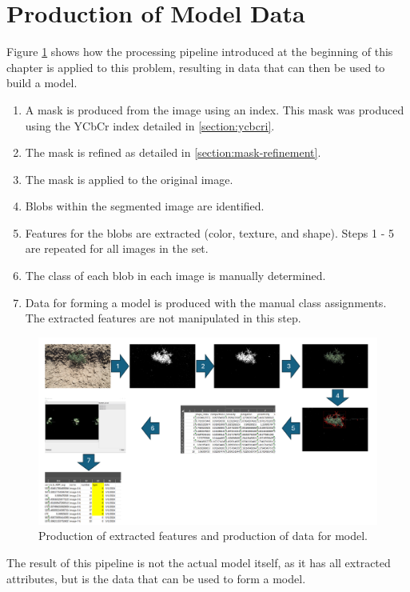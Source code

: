 \documentclass[letterpaper]{report}
\begin{document}
\section{Production of Model Data}
Figure \ref{fig:workflow-for-model-data} shows how the processing pipeline introduced at the beginning of this chapter is applied to this problem, resulting in data that can then be used to build a model. 
\begin{enumerate}
	\item{A mask is produced from the image using an index. This mask was produced using the YCbCr index detailed in \ref{section:ycbcri}.}
	\item{The mask is refined as detailed in \ref{section:mask-refinement}.}
	\item{The mask is applied to the original image.}
	\item{Blobs within the segmented image are identified.}
	\item{Features for the blobs are extracted (color, texture, and shape). Steps 1 - 5 are repeated for all images in the set.}
	\item{The class of each blob in each image is manually determined.}
	\item{Data for forming a model is produced with the manual class assignments. The extracted features are not manipulated in this step.}
\end{enumerate}

\begin{figure}[H]
	\centering
	\includegraphics[width=0.9\linewidth]{./figures/workflow-for-image.png}
	\caption[Production of extracted features]{Production of extracted features and production of data for model.}
	\label{fig:workflow-for-model-data}
\end{figure}

The result of this pipeline is not the actual model itself, as it has all extracted attributes, but is the data that can be used to form a model. 
\end{document}
